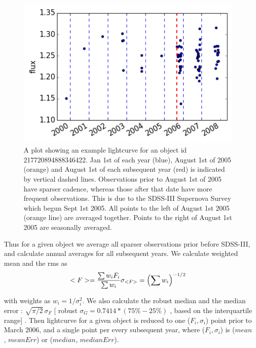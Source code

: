 \documentclass[fleqn,usenatbib]{mnras}  %
\begin{document}
\begin{figure}
\label{fig:lc_example}
 \includegraphics[width=\columnwidth]{Lightcurve_full_obj_217720894888346422.png}
 \cprotect\caption{A plot showing an example lightcurve for an object id 217720894888346422. Jan 1st of each year (blue),  August 1st of 2005 (orange) and August 1st of each subsequent year (red) is indicated by vertical dashed lines. Observations prior to August 1st of 2005 have sparser cadence, whereas those after that date have more frequent observations.  This is due to the SDSS-III Supernova Survey which begun  Sept 1st 2005.  All points to the left of August 1st 2005 (orange line) are averaged together.  Points to the right of August 1st 2005 are seasonally averaged. }
\end{figure}

Thus for a given object we average all sparser observations prior before SDSS-III, and calculate annual averages for all subsequent years. We calculate weighted mean and the rms as 
\begin{equation}
<F> = \frac{\sum {w_{i}F_{i}}}{\sum{w_{i}}} \\
\sigma_{<F>} = \left( \sum{w_{i}}\right) ^{-1/2} 
\end{equation}

with weights as  $w_{i} = 1 / \sigma_{i}^{2}$. We also calculate the robust  median and the median error : $\sqrt{\pi / 2} \, \sigma_{F}$  [ robust $\sigma_{G} = 0.7414 * (75\% - 25\%) $ , based on the interquartile range] . Then lightcurve for a given object is reduced to one ($F_{i}, \sigma_{i}$) point prior to March 2006, and a single point per every subsequent year, where  ($F_{i}, \sigma_{i}$) is ($mean$, $meanErr$) or ($median$, $medianErr$).
\end{document}
